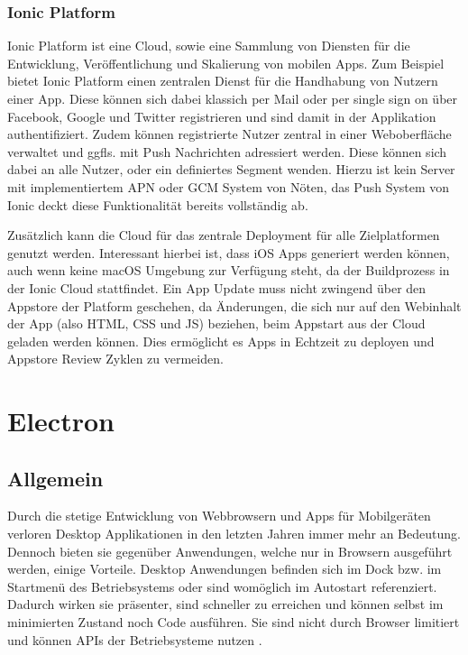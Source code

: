 \subsubsection{Ionic Platform}

Ionic Platform ist eine Cloud, sowie eine Sammlung von Diensten für die Entwicklung,
Veröffentlichung und Skalierung von mobilen Apps. Zum Beispiel bietet Ionic Platform einen zentralen Dienst für die Handhabung von Nutzern einer App.
Diese können sich dabei klassich per Mail oder per single sign on über
Facebook, Google und Twitter registrieren und sind damit in der Applikation authentifiziert.
Zudem können registrierte Nutzer zentral in einer Weboberfläche verwaltet und ggfls. mit Push Nachrichten adressiert werden.
Diese können sich dabei an alle Nutzer, oder ein definiertes Segment wenden.
Hierzu ist kein Server mit implementiertem \ac{APN} oder \ac{GCM} System von Nöten, das Push System von Ionic deckt diese
Funktionalität bereits vollständig ab.

Zusätzlich kann die Cloud für das zentrale Deployment für alle Zielplatformen genutzt werden.
Interessant hierbei ist, dass iOS Apps generiert werden können, auch wenn
keine macOS Umgebung zur Verfügung steht, da der Buildprozess in der Ionic Cloud stattfindet.
Ein App Update muss nicht zwingend über den Appstore der Platform geschehen,
da Änderungen, die sich nur auf den Webinhalt der App (also HTML, CSS und JS) beziehen,
beim Appstart aus der Cloud geladen werden können.
Dies ermöglicht es Apps in Echtzeit zu deployen und Appstore Review Zyklen zu vermeiden.


\section{Electron}
\subsection{Allgemein}

Durch die stetige Entwicklung von Webbrowsern und Apps für Mobilgeräten verloren Desktop Applikationen in den letzten Jahren immer mehr an Bedeutung.
Dennoch bieten sie gegenüber Anwendungen, welche nur in Browsern ausgeführt werden, einige Vorteile.
Desktop Anwendungen befinden sich im Dock bzw. im Startmenü des Betriebsystems oder sind womöglich im Autostart referenziert.
Dadurch wirken sie präsenter, sind schneller zu erreichen und können selbst im minimierten Zustand noch Code ausführen.
Sie sind nicht durch Browser limitiert und können APIs der Betriebsysteme nutzen \cite{Build58:online}.

